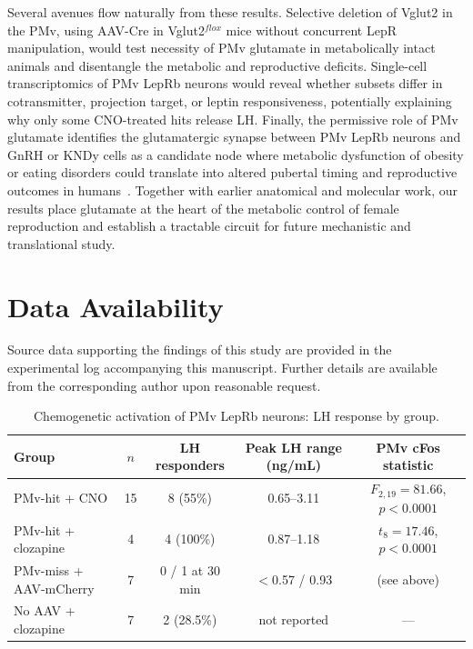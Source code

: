 \documentclass[11pt]{article}
\begin{document}
Several avenues flow naturally from these results. Selective deletion of Vglut2 in the PMv, using AAV-Cre in Vglut2$^{flox}$ mice without concurrent LepR manipulation, would test necessity of PMv glutamate in metabolically intact animals and disentangle the metabolic and reproductive deficits. Single-cell transcriptomics of PMv LepRb neurons would reveal whether subsets differ in cotransmitter, projection target, or leptin responsiveness, potentially explaining why only some CNO-treated hits release LH. Finally, the permissive role of PMv glutamate identifies the glutamatergic synapse between PMv LepRb neurons and GnRH or KNDy cells as a candidate node where metabolic dysfunction of obesity or eating disorders could translate into altered pubertal timing and reproductive outcomes in humans~\citep{farooqi2014twenty,ahima1997leptin,amstalden2011neuroendocrine}. Together with earlier anatomical and molecular work, our results place glutamate at the heart of the metabolic control of female reproduction and establish a tractable circuit for future mechanistic and translational study.

\section*{Data Availability}
Source data supporting the findings of this study are provided in the experimental log accompanying this manuscript. Further details are available from the corresponding author upon reasonable request.




\begin{table}[htbp]
\centering
\caption{Chemogenetic activation of PMv LepRb neurons: LH response by group.}
\label{tab:dreaddsummary}
\begin{tabular}{lcccc}
\toprule
Group & $n$ & LH responders & Peak LH range (ng/mL) & PMv cFos statistic \\
\midrule
PMv-hit + CNO & 15 & 8 (55\%) & 0.65--3.11 & $F_{2,19}=81.66$, $p<0.0001$ \\
PMv-hit + clozapine & 4 & 4 (100\%) & 0.87--1.18 & $t_{8}=17.46$, $p<0.0001$ \\
PMv-miss + AAV-mCherry & 7 & 0 / 1 at 30 min & $<$0.57 / 0.93 & (see above) \\
No AAV + clozapine & 7 & 2 (28.5\%) & not reported & --- \\
\bottomrule
\end{tabular}
\end{table}
\end{document}
